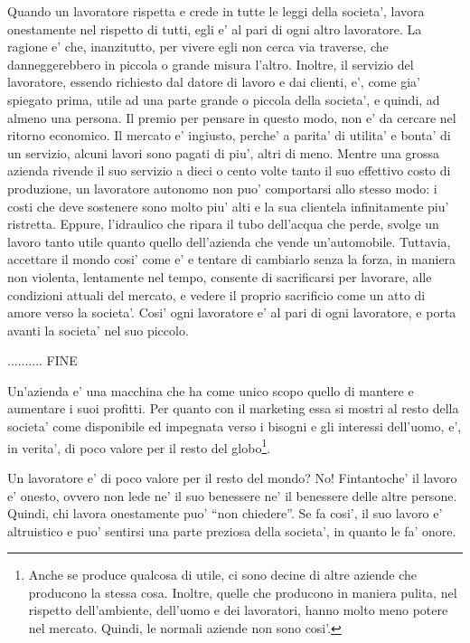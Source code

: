 Quando un lavoratore rispetta e crede in tutte le leggi della societa', lavora onestamente nel rispetto di tutti, egli e' al pari di ogni altro lavoratore. La ragione e' che, inanzitutto, per vivere egli non cerca via traverse, che danneggerebbero in piccola o grande misura l'altro. Inoltre, il servizio del lavoratore, essendo richiesto dal datore di lavoro e dai clienti, e', come gia' spiegato prima, utile ad una parte grande o piccola della societa', e quindi, ad almeno una persona.
  Il premio per pensare in questo modo, non e' da cercare nel ritorno economico. Il mercato e' ingiusto, perche' a parita' di utilita' e bonta' di un servizio, alcuni lavori sono pagati di piu', altri di meno. Mentre una grossa azienda rivende il suo servizio a dieci o cento volte tanto il suo effettivo costo di produzione, un lavoratore autonomo non puo' comportarsi allo stesso modo: i costi che deve sostenere sono molto piu' alti e la sua clientela infinitamente piu' ristretta. Eppure, l'idraulico che ripara il tubo dell'acqua che perde, svolge un lavoro tanto utile quanto quello dell'azienda che vende un'automobile.
Tuttavia, accettare il mondo cosi' come e' e tentare di cambiarlo senza la forza, in maniera non violenta, lentamente nel tempo, consente di sacrificarsi per lavorare, alle condizioni attuali del mercato, e vedere il proprio sacrificio come un atto di amore verso la societa'. Cosi' ogni lavoratore e' al pari di ogni lavoratore, e porta avanti la societa' nel suo piccolo.

.......... FINE

Un'azienda e' una macchina che ha come unico scopo quello di mantere e aumentare i suoi profitti. Per quanto con il marketing essa si mostri al resto della societa' come disponibile ed impegnata verso i bisogni e gli interessi dell'uomo, e', in verita', di poco valore per il resto del globo\footnote{Anche se produce qualcosa di utile, ci sono decine di altre aziende che producono la stessa cosa. Inoltre, quelle che producono in maniera pulita, nel rispetto dell'ambiente, dell'uomo e dei lavoratori, hanno molto meno potere nel mercato. Quindi, le normali aziende non sono cosi'.}.

Un lavoratore e' di poco valore per il resto del mondo?
No! Fintantoche' il lavoro e' onesto, ovvero non lede ne' il suo benessere ne' il benessere delle altre persone.\\
Quindi, chi lavora onestamente puo' ``non chiedere''. Se fa cosi', il suo lavoro e' altruistico e puo' sentirsi una parte preziosa della societa', in quanto le fa' onore.

